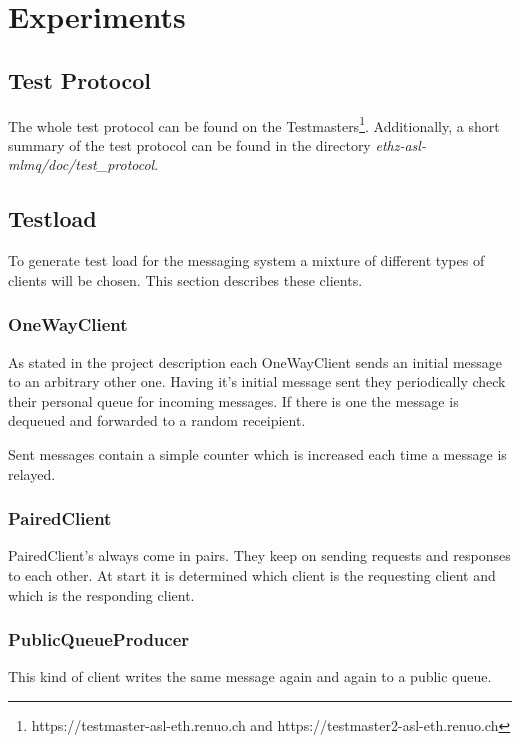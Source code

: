 \documentclass[milestone1.tex]{subfiles}
\begin{document}
\section{Experiments}

\subsection{Test Protocol}

The whole test protocol can be found on the Testmasters\footnote{https://testmaster-asl-eth.renuo.ch and https://testmaster2-asl-eth.renuo.ch}. Additionally, a short summary of the test protocol can be found in the directory \textit{ethz-asl-mlmq/doc/test\_protocol}.

\subsection{Testload}
To generate test load for the messaging system a mixture of different types of clients will be chosen. This section describes these clients.

\subsubsection{OneWayClient}
As stated in the project description each OneWayClient sends an initial message to an arbitrary other one. Having it's initial message sent they periodically check their personal queue for incoming messages. If there is one the message is dequeued and forwarded to a random receipient.

Sent messages contain a simple counter which is increased each time a message is relayed.

\subsubsection{PairedClient}
PairedClient's always come in pairs. They keep on sending requests and responses to each other. At start it is determined which client is the requesting client and which is the responding client.

\subsubsection{PublicQueueProducer}
This kind of client writes the same message again and again to a public queue.
\end{document}
